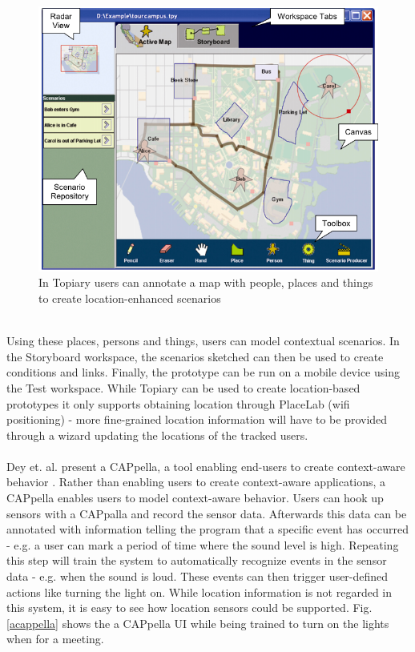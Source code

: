 \begin{figure}
	\centering
	\includegraphics[scale=0.4]{fig/topiary}
	\caption{In Topiary \cite{Li:2004:TTP:1029632.1029671} users can annotate a map with people, places and things to create location-enhanced scenarios}
	\label{fig:topiary}
\end{figure}
\\
\noindent Using these places, persons and things, users can model contextual scenarios. In the Storyboard workspace, the scenarios sketched can then be used to create conditions and links. Finally, the prototype can be run on a mobile device using the Test workspace. While Topiary can be used to create location-based prototypes it only supports obtaining location through PlaceLab (wifi positioning) - more fine-grained location information will have to be provided through a wizard updating the locations of the tracked users. 
\\\\
Dey et. al. present a CAPpella, a tool enabling end-users to create context-aware behavior \cite{Dey:2004:CPD:985692.985697}. Rather than enabling users to create context-aware applications, a CAPpella enables users to model context-aware behavior. Users can hook up sensors with a CAPpalla and record the sensor data. Afterwards this data can be annotated with information telling the program that a specific event has occurred - e.g. a user can mark a period of time where the sound level is high. Repeating this step will train the system to automatically recognize events in the sensor data - e.g. when the sound is loud. These events can then trigger user-defined actions like turning the light on. While location information is not regarded in this system, it is easy to see how location sensors could be supported. Fig. \ref{acappella} shows the a CAPpella UI while being trained to turn on the lights when for a meeting.

